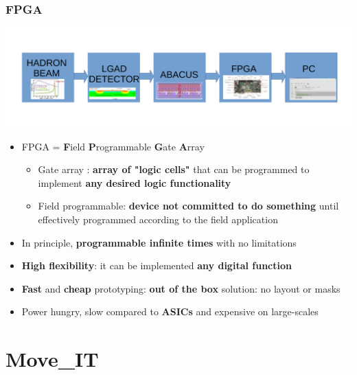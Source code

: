 \documentclass[aspectratio=169]{beamer}
\begin{document}
		\begin{frame}
	\frametitle{FPGA}
	\begin{center}
		\includegraphics[width=0.7 \textwidth]{IMG/Block_Diagram.pdf}
	\end{center}
		\begin{itemize}
			\item FPGA = \textbf{F}ield \textbf{P}rogrammable \textbf{G}ate \textbf{A}rray
			\begin{itemize}
				\item Gate array : \textbf{array of "logic cells"} that can be programmed to implement \textbf{any desired logic functionality}
				\item Field programmable: \textbf{device not committed to do something} until effectively programmed according to the field application
			\end{itemize}
			\item In principle, \textbf{programmable infinite times} with no limitations
			\item \textbf{High flexibility}: it can be implemented \textbf{any digital function}
			\item \textbf{Fast} and \textbf{cheap} prototyping: \textbf{out of the box} solution: no layout or masks
			\item {\color{orange} Power hungry, slow compared to \textbf{ASICs} and expensive on large-scales}
		\end{itemize}
	\end{frame}

\section{Move\_IT}
\end{document}
